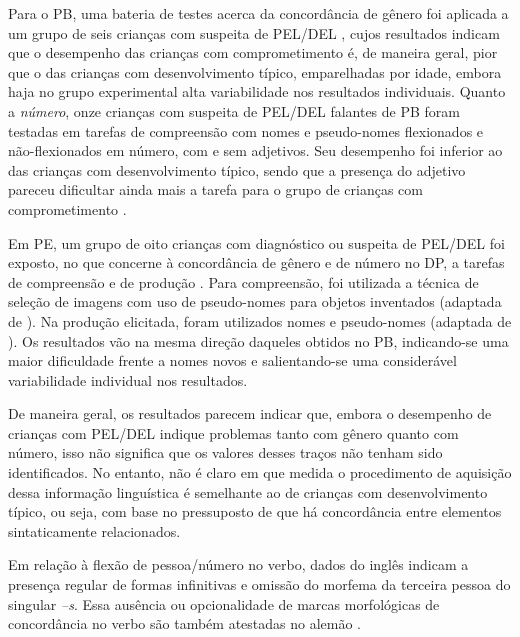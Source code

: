 \documentclass[output=paper]{LSP/langsci}
\begin{document}
Para o PB, uma bateria de testes acerca da concordância de gênero foi aplicada a um grupo de seis crianças com suspeita de PEL/DEL \citep{silveira2006}, cujos resultados indicam que o desempenho das crianças com comprometimento é, de maneira geral, pior que o das crianças com desenvolvimento típico, emparelhadas por idade, embora haja no grupo experimental alta variabilidade nos resultados individuais. Quanto a \textit{número}, onze crianças com suspeita de PEL/DEL falantes de PB foram testadas em tarefas de compreensão com nomes e pseudo-nomes flexionados e não-flexionados em número, com e sem adjetivos. Seu desempenho foi inferior ao das crianças com desenvolvimento típico, sendo que a presença do adjetivo pareceu dificultar ainda mais a tarefa para o grupo de crianças com comprometimento \citep{bomfim2008}.

Em PE, um grupo de oito crianças com diagnóstico ou suspeita de PEL/DEL foi exposto, no que concerne à concordância de gênero e de número no DP, a tarefas de compreensão e de produção \citep{branco_etal2011}. Para compreensão, foi utilizada a técnica de seleção de imagens com uso de pseudo-nomes para objetos inventados (adaptada de \citealt{correa_etal2010}). Na produção elicitada, foram utilizados nomes e pseudo-nomes (adaptada de \citealt{silveira2006}). Os resultados vão na mesma direção daqueles obtidos no PB, indicando-se uma maior dificuldade frente a nomes novos e salientando-se uma considerável variabilidade individual nos resultados.

De maneira geral, os resultados parecem indicar que, embora o desempenho de crianças com PEL/DEL indique problemas tanto com gênero quanto com número, isso não significa que os valores desses traços não tenham sido identificados. No entanto, não é claro em que medida o procedimento de aquisição dessa informação linguística é semelhante ao de crianças com desenvolvimento típico, ou seja, com base no pressuposto de que há concordância entre elementos sintaticamente relacionados. 

Em relação à flexão de pessoa/número no verbo, dados do inglês indicam a presença regular de formas infinitivas e omissão do morfema da terceira pessoa do singular \textit{–s}. Essa ausência ou opcionalidade de marcas morfológicas de concordância no verbo são também atestadas no alemão \citep{clahsen_etal1997}. 
\end{document}
